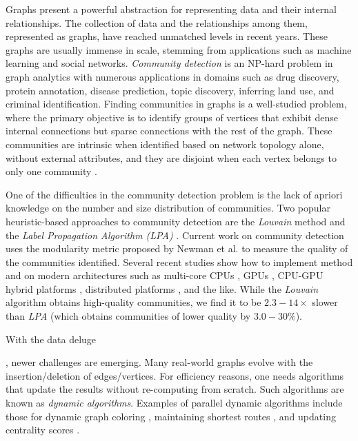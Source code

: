 Graphs present a powerful abstraction for representing data and their internal relationships. The collection of data and the relationships among them, represented as graphs, have reached unmatched levels in recent years. These graphs are usually immense in scale, stemming from applications such as machine learning and social networks. \textit{Community detection} is an NP-hard problem in graph analytics with numerous applications in domains such as drug discovery, protein annotation, disease prediction, topic discovery, inferring land use, and criminal identification. Finding communities in graphs is a well-studied problem, where the primary objective is to identify groups of vertices that exhibit dense internal connections but sparse connections with the rest of the graph. These communities are intrinsic when identified based on network topology alone, without external attributes, and they are disjoint when each vertex belongs to only one community \cite{com-gregory10}.

One of the difficulties in the community detection problem is the lack of apriori knowledge on the number and size distribution of communities. Two popular heuristic-based approaches to community detection are the \textit{Louvain} method \cite{com-blondel08} and the \textit{Label Propagation Algorithm (LPA)} \cite{com-raghavan07}. Current work on community detection uses the modularity metric proposed by Newman et al. \cite{com-newman06} to measure the quality of the communities identified. Several recent studies show how to implement \Lou{} method and \LPA{} on modern architectures such as multi-core CPUs \cite{com-fazlali17}, GPUs \cite{com-cheong13}, CPU-GPU hybrid platforms \cite{com-bhowmick22}, distributed platforms \cite{com-ghosh18}, and the like. While the \textit{Louvain} algorithm obtains high-quality communities, we find it to be $2.3 - 14\times$ slower than \textit{LPA} (which obtains communities of lower quality by $3.0 - 30\%$).

With the data deluge, newer challenges are emerging. Many real-world graphs evolve with the insertion/deletion of edges/vertices. For efficiency reasons, one needs algorithms that update the results without re-computing from scratch. Such algorithms are known as \textit{dynamic algorithms}. Examples of parallel dynamic algorithms include those for dynamic graph coloring \cite{color-yuan17, color-bhattacharya18}, maintaining shortest routes \cite{path-zhang17, path-khanda21}, and updating centrality scores \cite{cent-shao20, cent-regunta21}.

